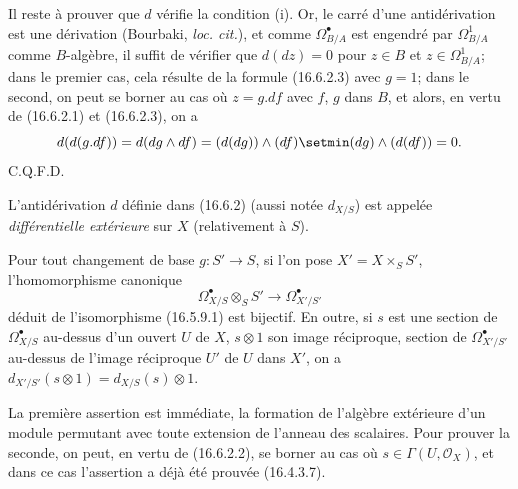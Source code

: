 Il reste à prouver que $d$ vérifie la condition (i). Or, le carré d'une
antidérivation est une dérivation (Bourbaki, \emph{loc. cit.}), et comme
$\Omega_{B/A}^{\bullet}$ est engendré par $\Omega_{B/A}^1$ comme
$B$-algèbre, il suffit de vérifier que $d(dz)=0$ pour $z\in B$ et
$z\in\Omega_{B/A}^1$; dans le premier cas, cela résulte de la formule
(16.6.2.3) avec $g=1$; dans le second, on peut se borner au cas où $z=g.df$
avec $f$, $g$ dans $B$, et alors, en vertu de (16.6.2.1) et (16.6.2.3), on a
\[
  d(d(g.df))=d(dg\wedge df)
  =(d(dg))\wedge(df)\setmin(dg)\wedge(d(df))=0.
\]
\hfill C.Q.F.D.

\begin{definition}[16.6.3]
L'antidérivation $d$ définie dans \textup{(16.6.2)} (aussi notée $d_{X/S}$) est
appelée \emph{différentielle extérieure} sur $X$ (relativement à $S$).
\end{definition}

\begin{proposition}[16.6.4]
\label{IV.16.6.4}
Pour tout changement de base $g:S'\to S$, si l'on pose
$X'=X\times_S S'$, l'homomorphisme canonique
\[
  \varOmega_{X/S}^{\bullet}\otimes_S S'
  \longrightarrow\varOmega_{X'/S'}^{\bullet}
  \tag{16.6.4.1}
  \label{IV.16.6.4.1}
\]
déduit de l'isomorphisme \textup{(16.5.9.1)} est bijectif. En outre, si $s$ est une
section de $\varOmega_{X/S}^{\bullet}$ au-dessus d'un ouvert $U$ de $X$,
$s\otimes1$ son image réciproque, section de $\varOmega_{X'/S'}^{\bullet}$
au-dessus de l'image réciproque $U'$ de $U$ dans $X'$, on a
$d_{X'/S'}(s\otimes1)=d_{X/S}(s)\otimes1$.
\end{proposition}

La première assertion est immédiate, la formation de l'algèbre extérieure
d'un module permutant avec toute extension de l'anneau des scalaires. Pour
prouver la seconde, on peut, en vertu de (16.6.2.2), se borner au cas où
$s\in\Gamma(U,\mathcal{O}_X)$, et dans ce cas l'assertion a déjà été prouvée
(16.4.3.7).

